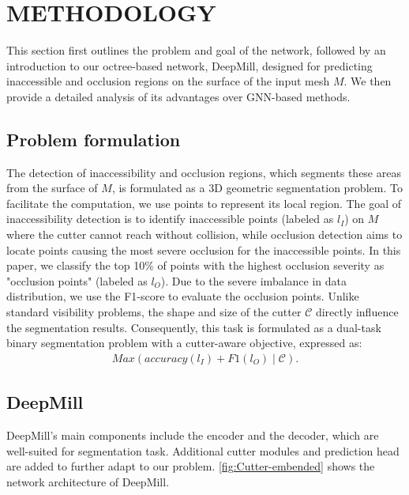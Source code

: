 \section{METHODOLOGY}
This section first outlines the problem and goal of the network, followed by an introduction to our octree-based network, DeepMill, designed for predicting inaccessible and occlusion regions on the surface of the input mesh $M$. We then provide a detailed analysis of its advantages over GNN-based methods.


\subsection{Problem formulation}
The detection of inaccessibility and occlusion regions, which segments these areas from the surface of $M$, is formulated as a 3D geometric segmentation problem. 
To facilitate the computation, we use points to represent its local region.
The goal of inaccessibility detection is to identify inaccessible points (labeled as $l_I$) on $M$ where the cutter cannot reach without collision, while occlusion detection aims to locate points causing the most severe occlusion for the inaccessible points. 
In this paper, we classify the top 10$\%$ of points with the highest occlusion severity as "occlusion points" (labeled as $l_O$).
Due to the severe imbalance in data distribution, we use the F1-score to evaluate the occlusion points.
Unlike standard visibility problems, the shape and size of the cutter $\mathcal{C}$ directly influence the segmentation results. Consequently, this task is formulated as a dual-task binary segmentation problem with a cutter-aware objective, expressed as:
\begin{equation}
\label{eq:weightSet}
\begin{aligned}
Max(accuracy(l_I)+F1(l_O)\;|\;\mathcal{C}).
\end{aligned}
\end{equation}




\subsection{DeepMill}
DeepMill's main components include the encoder and the decoder, which are well-suited for segmentation task. Additional cutter modules and prediction head are added to further adapt to our problem. \autoref{fig:Cutter-embended} shows the network architecture of DeepMill.

